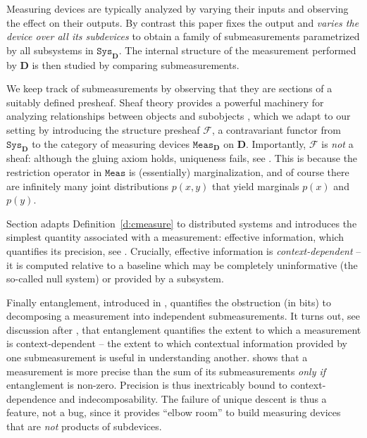 \documentclass[12pt]{article}
\newcommand{\univ}{{\mathbf D}}
\newcommand{\psheaf}{{\mathcal F}}
\newcommand{\subs}{{\mathtt{Sys}}}
\newcommand{\mcat}{{\mathtt{Meas}}}
\theoremstyle{remark}
\begin{document}
Measuring devices are typically analyzed by varying their 
inputs and observing the effect on their outputs. By contrast 
this paper fixes the output and \emph{varies the device over 
all its subdevices} to obtain a family of submeasurements 
parametrized by all subsystems in $\subs_\univ$. The internal 
structure of the measurement performed by $\univ$ is then 
studied by comparing submeasurements.

We keep track of submeasurements by observing that they are 
sections of a suitably defined presheaf. Sheaf theory provides 
a powerful machinery for analyzing relationships between 
objects and subobjects \cite{maclane:92}, which we adapt to 
our setting by introducing the structure presheaf $\psheaf$, 
a contravariant functor from  $\subs_\univ$ to the category 
of measuring devices $\mcat_\univ$ on $\univ$. Importantly, 
$\psheaf$ is \emph{not} a sheaf: although the gluing axiom 
holds, uniqueness fails, see %
. 
This is because the restriction operator in $\mcat$ is 
(essentially) marginalization, and of course there are 
infinitely many joint distributions $p(x,y)$ that yield 
marginals $p(x)$ and $p(y)$. 

Section %
adapts Definition~\ref{d:cmeasure} to distributed systems and 
introduces the simplest quantity associated with a measurement:
effective information, which quantifies its precision, see 
. 
Crucially, effective information is \emph{context-dependent} --
it is computed relative to a baseline which may be completely 
uninformative (the so-called null system) or provided by a 
subsystem. 

Finally entanglement, introduced in %
, 
quantifies the obstruction (in bits) to decomposing a 
measurement into independent submeasurements. It turns out, 
see discussion after %
, 
that entanglement quantifies the extent to which a measurement 
is context-dependent -- the extent to which contextual 
information provided by one submeasurement is useful in 
understanding another. %
shows that a measurement is more precise than the sum of its 
submeasurements \emph{only if} entanglement is non-zero. 
Precision is thus inextricably bound to context-dependence 
and indecomposability. The failure of unique descent is thus 
a feature, not a bug, since it provides ``elbow room'' to 
build measuring devices that are \emph{not} products of 
subdevices. 
\end{document}
